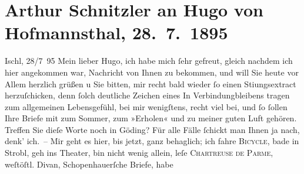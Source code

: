 

         
         \newcommand{\erwaehntePersonen}{Personen: Julius Frauenstädt, Paul Goldmann, Hugo von Hofmannsthal, Ernst Otto Lindner, Ludwig Schemann, Arthur Schopenhauer}
         \newcommand{\erwaehnteOrte}{Orte: Bad Ischl, Hodonín, Kopenhagen, Strobl, Wien}
         \newcommand{\erwaehnteWerke}{Werke: Arthur Schopenhauer. Von ihm. Über ihn, Die Frau des Weisen. Erzählung, Die Kartause von Parma, Freiwild. Schauspiel in 3 Akten, Schopenhauer-Briefe, West-östlicher Divan}
               \section[Arthur Schnitzler an Hugo von Hofmannsthal, 28. 7. 1895]{ Arthur Schnitzler an Hugo von Hofmannsthal, 28. 7. 1895}\nopagebreak{}\rehead{ }\begin{ledgroupsized}[t]{13cm}\normalsize\beginnumbering \toendnotes[C]{\smallbreak\pagebreak[2]} 
\toendnotes[C]{\smallbreak}\pstart
           \raggedleft{}{\pb}Ischl, 28/7 95\pend
           \pstart
           Mein lieber Hugo, ich habe mich ſehr gefreut, gleich nachdem ich
               hier angekommen war, Nachricht von Ihnen zu bekommen, und will Sie heute vor Allem
               herzlich grüßen u Sie bitten, mir recht bald wieder ſo einen Sti{\geminationm}ungsextract herzuſchicken, denn ſolch deutliche Zeichen
               eines In Verbindungbleibens tragen zum allgemeinen Lebensgefühl, bei mir wenigſtens,
               recht viel bei, und ſo ſollen {\pb}Ihre Briefe mit zum
               Sommer, zum »Erholen« und zu meiner guten Luft gehören. Treffen Sie dieſe Worte noch
               in Göding? Für alle Fälle ſchickt man Ihnen ja
               nach, denk’ ich. – Mir geht es hier, bis jetzt, ganz behaglich; ich fahre \textsc{Bicycle}, bade in Strobl,
               geh ins Theater, bin nicht wenig allein, leſe \textsc{Chartreuse de Parme}, weſtöſtl. Divan, Schopenhauerſche Briefe, habe

\end{ledgroupsized}
